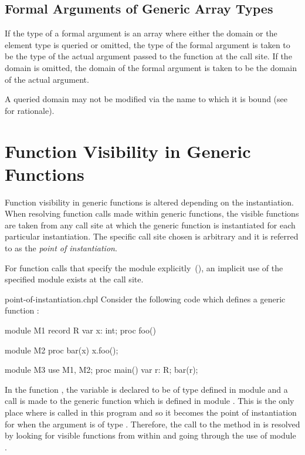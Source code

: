 \subsection{Formal Arguments of Generic Array Types}
\label{Formal_Arguments_of_Generic_Array_Types}

If the type of a formal argument is an array where either the domain
or the element type is queried or omitted, the type of the formal
argument is taken to be the type of the actual argument passed to the
function at the call site.  If the domain is omitted, the domain of
the formal argument is taken to be the domain of the actual argument.

A queried domain may not be modified via the name to which it is bound
(see~ for rationale).

\section{Function Visibility in Generic Functions}
\label{Function_Visibility_in_Generic_Functions}

Function visibility in generic functions is altered depending on the
instantiation.  When resolving function calls made within generic
functions, the visible functions are taken from any call site at which
the generic function is instantiated for each particular
instantiation.  The specific call site chosen is arbitrary and it is
referred to as the \emph{point of instantiation}.

For function calls that specify the module
explicitly~(), an implicit use of the specified
module exists at the call site.

\begin{chapelexample}{point-of-instantiation.chpl}
Consider the following code which defines a generic
function :
\begin{chapel}
module M1 {
  record R {
    var x: int;
    proc foo() { }
  }
}

module M2 {
  proc bar(x) {
    x.foo();
  }
}

module M3 {
  use M1, M2;
  proc main() {
    var r: R;
    bar(r);
  }
}
\end{chapel}
\begin{chapeloutput}
\end{chapeloutput}
In the function , the variable  is declared to be
of type  defined in module  and a call is made to the
generic function  which is defined in module .
This is the only place where  is called in this program and
so it becomes the point of instantiation for  when the
argument  is of type .  Therefore, the call to
the  method in  is resolved by looking for visible
functions from within  and going through the use of
module .
\end{chapelexample}

